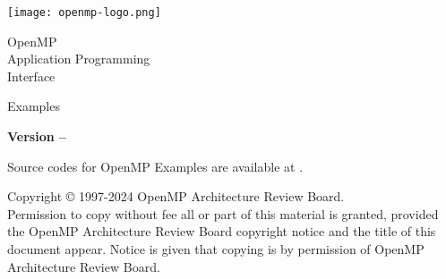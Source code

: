 
  \begin{titlepage}
    \begin{flushleft}
     \hspace{-6em} \texttt{[image: openmp-logo.png]}
    \end{flushleft}

    \begin{adjustwidth}{-0.75in}{0in}
    \begin{center}
      \Huge
      \textsf{OpenMP\\Application Programming\\Interface}

      \vspace{0.5in}\textsf{Examples}\vspace{-0.7in}
      \normalsize

      \vspace{1.0in}

      \textbf{Version \VER{} -- \VERDATE}
    \end{center}
    \end{adjustwidth}

    \vspace{2.3in} %

Source codes for OpenMP Examples \VER{} are available at
 .\\

\begin{adjustwidth}{0pt}{1em}\setlength{\parskip}{0.25\baselineskip}%
Copyright \copyright{} 1997-2024 OpenMP Architecture Review Board.\\
Permission to copy without fee all or part of this material is granted,
provided the OpenMP Architecture Review Board copyright notice and
the title of this document appear. Notice is given that copying is by
permission of OpenMP Architecture Review Board.\end{adjustwidth}

  \end{titlepage}





